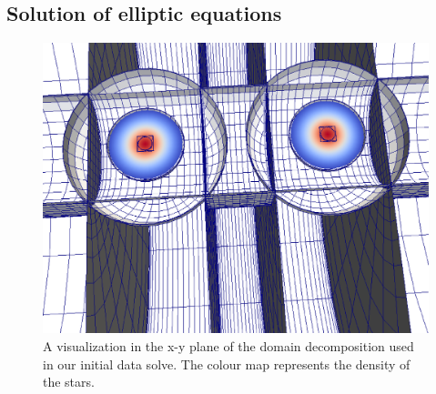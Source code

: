 \documentclass[aps,prd,amsmath,floatfix
,twocolumn
,superscriptaddress,nofootinbib,showpacs]{revtex4-1}
\theoremstyle{plain} \newtheorem{thm}{Theorem} \newtheorem{lem}{Lemma}
\newcommand{\red}[1]{\textcolor{Red}{#1}}
\begin{document}


\subsection{Solution of elliptic equations}


\begin{figure}
\includegraphics[width=0.95\columnwidth,trim=0 185 0 0, clip=true]{TheDomain}
\caption{\label{fig:TheDomain} A visualization in the x-y plane of the
  domain decomposition used in our initial data solve. The colour map
  represents the density of the stars.  }
\end{figure}
\end{document}

